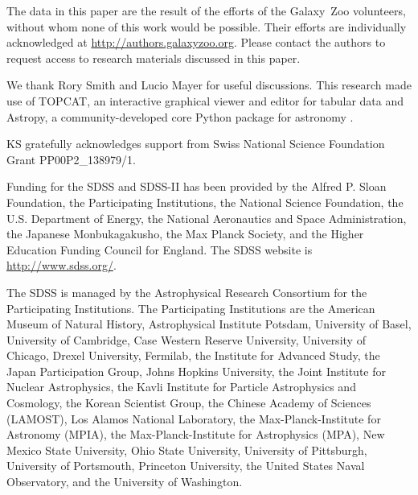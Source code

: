 \documentclass{emulateapj}
\begin{document}
The data in this paper are the result of the efforts of the Galaxy~Zoo volunteers, without whom none of this work would be possible. Their efforts are individually acknowledged at \url{http://authors.galaxyzoo.org}. Please contact the authors to request access to research materials discussed in this paper. 

We thank Rory Smith and Lucio Mayer for useful discussions. This research made use of TOPCAT, an interactive graphical viewer and editor for tabular data \citep{tay05} and Astropy, a community-developed core Python package for astronomy \citep{ast13}. 

KS gratefully acknowledges support from Swiss National Science Foundation Grant PP00P2\_138979/1.

Funding for the SDSS and SDSS-II has been provided by the Alfred P. Sloan Foundation, the Participating Institutions, the National Science Foundation, the U.S. Department of Energy, the National Aeronautics and Space Administration, the Japanese Monbukagakusho, the Max Planck Society, and the Higher Education Funding Council for England. The SDSS website is \url{http://www.sdss.org/}.

The SDSS is managed by the Astrophysical Research Consortium for the Participating Institutions. The Participating Institutions are the American Museum of Natural History, Astrophysical Institute Potsdam, University of Basel, University of Cambridge, Case Western Reserve University, University of Chicago, Drexel University, Fermilab, the Institute for Advanced Study, the Japan Participation Group, Johns Hopkins University, the Joint Institute for Nuclear Astrophysics, the Kavli Institute for Particle Astrophysics and Cosmology, the Korean Scientist Group, the Chinese Academy of Sciences (LAMOST), Los Alamos National Laboratory, the Max-Planck-Institute for Astronomy (MPIA), the Max-Planck-Institute for Astrophysics (MPA), New Mexico State University, Ohio State University, University of Pittsburgh, University of Portsmouth, Princeton University, the United States Naval Observatory, and the University of Washington.
\end{document}

